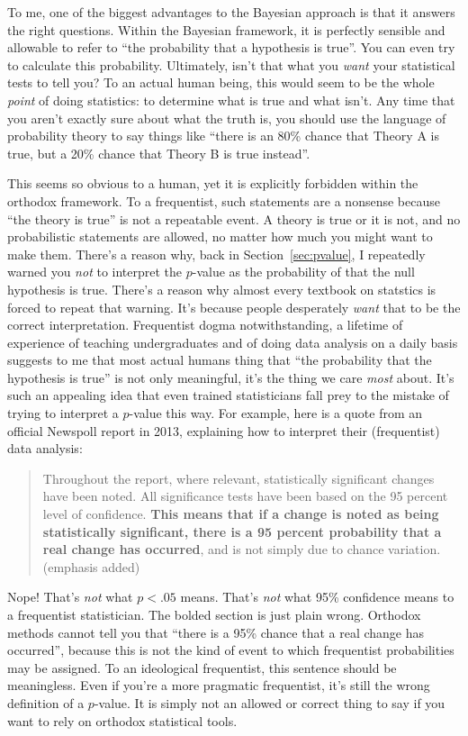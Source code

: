 To me, one of the biggest advantages to the Bayesian approach is that it answers the right questions. Within the Bayesian framework, it is perfectly sensible and allowable to refer to ``the probability that a hypothesis is true''. You can even try to calculate this probability. Ultimately, isn't that what you {\it want} your statistical tests to tell you? To an actual human being, this would seem to be the whole {\it point} of doing statistics: to determine what is true and what isn't. Any time that you aren't exactly sure about what the truth is, you should use the language of probability theory to say things like ``there is an 80\% chance that Theory A is true, but a 20\% chance that Theory B is true instead''. 

This seems so obvious to a human, yet it is explicitly forbidden within the orthodox framework. To a frequentist, such statements are a nonsense because ``the theory is true'' is not a repeatable event. A theory is true or it is not, and no probabilistic statements are allowed, no matter how much you might want to make them. There's a reason why, back in Section~\ref{sec:pvalue}, I repeatedly warned you {\it not} to interpret the $p$-value as the probability of that the null hypothesis is true. There's a reason why almost every textbook on statstics is forced to repeat that warning. It's because people desperately {\it want} that to be the correct interpretation. Frequentist dogma notwithstanding, a lifetime of experience of teaching undergraduates and of doing data analysis on a daily basis suggests to me that most actual humans thing that ``the probability that the hypothesis is true'' is not only meaningful, it's the thing we care {\it most} about. It's such an appealing idea that even trained statisticians fall prey to the mistake of trying to interpret a $p$-value this way. For example, here is a quote from an official Newspoll report in 2013, explaining how to interpret their (frequentist) data analysis:
\begin{quote}
Throughout the report, where relevant, statistically significant changes have been noted. All significance tests have been based on the 95 percent level of confidence. {\bf This means that if a change is noted as being statistically significant, there is a 95 percent probability that a real change has occurred}, and is not simply due to chance variation. (emphasis added)
\end{quote}
Nope! That's {\it not} what $p<.05$ means. That's {\it not} what 95\% confidence means to a frequentist statistician. The bolded section is just plain wrong. Orthodox methods cannot tell you that ``there is a 95\% chance that a real change has occurred'', because this is not the kind of event to which frequentist probabilities may be assigned. To an ideological frequentist, this sentence should be meaningless. Even if you're a more pragmatic frequentist, it's still the wrong definition of a $p$-value. It is simply not an allowed or correct thing to say if you want to rely on orthodox statistical tools. 

